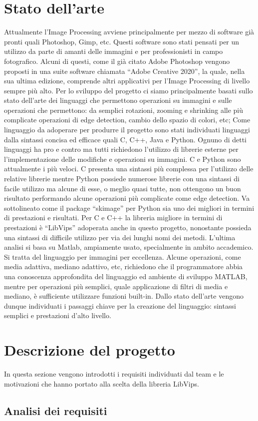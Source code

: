 \documentclass[10pt]{article}
\begin{document}
\section{Stato dell'arte}Attualmente l’Image Processing avviene principalmente per mezzo di software già pronti quali Photoshop, Gimp, etc. Questi software sono stati pensati per un utilizzo da parte di amanti delle immagini e per professionisti in campo fotografico. Alcuni di questi, come il già citato Adobe Photoshop vengono proposti in una suite software chiamata “Adobe Creative 2020”, la quale, nella sua ultima edizione, comprende altri applicativi per l’Image Processing di livello sempre più alto.
Per lo sviluppo del progetto ci siamo principalmente basati sullo stato dell’arte dei linguaggi che permettono operazioni su immagini e sulle operazioni che permettono: da semplici  rotazioni, zooming e shrinking alle più complicate operazioni di edge detection, cambio dello spazio di colori, etc;\newline
Come linguaggio da adoperare per produrre il progetto sono stati individuati linguaggi dalla sintassi concisa ed efficace quali C, C++, Java e Python. Ognuno di detti linguaggi ha pro e contro ma tutti richiedono l’utilizzo di librerie esterne per l’implementazione delle modifiche e operazioni su immagini. C e Python sono attualmente i più veloci. C presenta una sintassi più complessa per l’utilizzo delle relative librerie mentre Python possiede numerose librerie con una sintassi di facile utilizzo ma alcune di esse, o meglio quasi tutte, non ottengono un buon risultato performando alcune operazioni più complicate come edge detection. Va sottolineato come il package “skimage” per Python sia uno dei migliori in termini di prestazioni e risultati. Per C e C++ la libreria migliore in termini di prestazioni è “LibVips” adoperata anche in questo progetto, nonostante possieda una sintassi di difficile utilizzo per via dei lunghi nomi dei metodi. L’ultima analisi si basa su Matlab, ampiamente usato, specialmente in ambito accademico. Si tratta del linguaggio per immagini per eccellenza. Alcune operazioni, come media adattiva, mediano adattivo, etc, richiedono che il programmatore abbia una conoscenza approfondita del linguaggio ed ambiente di sviluppo MATLAB, mentre per operazioni più semplici, quale applicazione di filtri di media e mediano, è sufficiente utilizzare funzioni built-in.
Dallo stato dell’arte vengono dunque individuati i passaggi chiave per la creazione del linguaggio: sintassi semplici e prestazioni d’alto livello.\newpage

\section{Descrizione del progetto}In questa sezione vengono introdotti i requisiti individuati dal team e le motivazioni che hanno portato alla scelta della libreria LibVips.
\subsection{Analisi dei requisiti}
\end{document}
